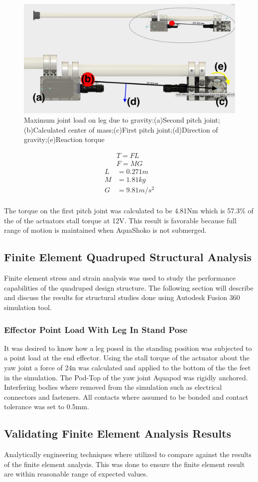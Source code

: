\begin{figure}[h]
\centering
\includegraphics[width=1.0\columnwidth]{./img/aquaShoko-v3dot3-legCOM.png}
\caption{Maximum joint load on leg due to gravity:(a)Second pitch joint;(b)Calculated center of mass;(c)First pitch joint;(d)Direction of gravity;(e)Reaction torque}
\label{fig:shoko 3dot2}
\end{figure}


\begin{align}\label{eq:head}
    T = FL   \\
    F = MG
\end{align}
\begin{align*}
    L & = 0.271 m         \\
    M & = 1.81 kg       \\
    G & = 9.81 m/s^2    \\
\end{align*}

The torque on the first pitch joint was calculated to be 4.81Nm which is 57.3\% of the of the actuators stall torque at 12V. This result is favorable because full range of motion is maintained when AquaShoko is not submerged.

\subsection{Finite Element Quadruped Structural Analysis}
Finite element stress and strain analysis was used to study the performance capabilities of the quadruped design structure. 
The following section will describe and discuss the results for structural studies done using Autodesk Fusion 360 simulation tool.

\subsubsection{Effector Point Load With Leg In Stand Pose }
It was desired to know how a leg posed in the standing position was subjected to a point load at the end effector. Using the stall torque of the actuator about the yaw joint a force of 24n was calculated and applied to the bottom of the the feet in the simulation. The Pod-Top of the yaw joint Aquapod was rigidly anchored. 
Interfering bodies where removed from the simulation such as electrical connectors and fasteners. All contacts where assumed to be bonded and contact tolerance was set to 0.5mm.


\subsection{Validating Finite Element Analysis Results}
Analytically engineering techniques where utilized to compare against the results of the finite element analysis. This was done to ensure the finite element result are within reasonable range of expected values.